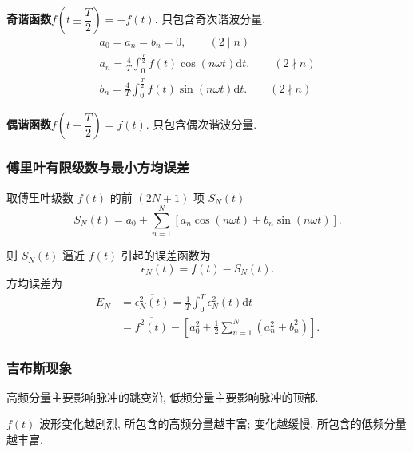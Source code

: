 \textbf{奇谐函数}\quad $f\left(t\pm\dfrac{T}{2}\right)=-f(t)$. 只包含奇次谐波分量.
\srmg
\begin{gather}
    a_0=a_n=b_n=0,\qquad (2\mid n) \\
    a_n=\frac{4}{T}\int_{0}^{\frac{T}{2}}f(t)\cos(n\omega t)\mathrm{d}t,\qquad (2\nmid n) \\
    b_n=\frac{4}{T}\int_{0}^{\frac{T}{2}}f(t)\sin(n\omega t)\mathrm{d}t.\qquad (2\nmid n)
\end{gather}

\textbf{偶谐函数}\quad $f\left(t\pm\dfrac{T}{2}\right)=f(t)$. 只包含偶次谐波分量.

\subsubsection{傅里叶有限级数与最小方均误差}
取傅里叶级数 $f(t)$ 的前 $(2N+1)$ 项 $S_N(t)$
\begin{equation}
    S_N(t)=a_0+\sum_{n=1}^{N}[a_n\cos(n\omega t)+b_n\sin(n\omega t)].
\end{equation}

则 $S_N(t)$ 逼近 $f(t)$ 引起的误差函数为
\begin{equation}
    \epsilon_N(t)=f(t)-S_N(t).
\end{equation}
方均误差为
\begin{equation}
    \begin{aligned}
        E_N & =\overline{\epsilon_N^2(t)}=\frac{1}{T}\int_{0}^{T}\epsilon_N^2(t)\mathrm{d}t \\
            & =\overline{f^2(t)}-\left[a_0^2+\frac{1}{2}\sum_{n=1}^{N}(a_n^2+b_n^2)\right].
    \end{aligned}
\end{equation}

\subsubsection{吉布斯现象}
高频分量主要影响脉冲的跳变沿, 低频分量主要影响脉冲的顶部.

$f(t)$ 波形变化越剧烈, 所包含的高频分量越丰富; 变化越缓慢, 所包含的低频分量越丰富.

